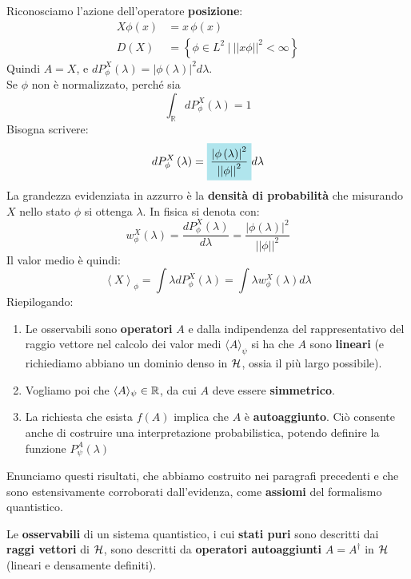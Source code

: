 \documentclass[../../FisicaTeorica.tex]{subfiles}
\begin{document}
Riconosciamo l'azione dell'operatore \textbf{posizione}:
\begin{align*}
    X\phi \left(x\right)&=x\,\phi \left(x\right)\\
    D\left(X\right)&=\left\{\phi\in L^2\ |\ \left|\left|x\phi\right|\right|^2<\infty\right\}
\end{align*}
Quindi $A=X$, e $dP_\phi^X(\lambda) = |\phi(\lambda)|^2 d\lambda$.\\
Se $\phi$  non è normalizzato, perché sia \[ \int_{\mathbb{R}}{dP_\phi^X\left(\lambda\right)}=1 \]
Bisogna scrivere:
\[
dP_\phi^X\left(\lambda\right)=\hlc{SkyBlue}{\frac{\left|\phi\left(\lambda\right)\right|^2}{\left|\left|\phi\right|\right|^2}}d\lambda 
\]
La grandezza evidenziata in azzurro è la \textbf{densità di probabilità} che misurando $X$ nello stato $\phi$ si ottenga $\lambda$. In fisica si denota con:
\[
w_\phi^X\left(\lambda\right)=\frac{dP_\phi^X\left(\lambda\right)}{d\lambda}=\frac{\left|\phi\left(\lambda\right)\right|^2}{\left|\left|\phi\right|\right|^2}
\]
Il valor medio è quindi:
\[
\left\langle X\right\rangle_\phi=\int \lambda  dP_\phi^X\left(\lambda\right)=\int \lambda  w_\phi^X\left(\lambda\right) d\lambda 
\]
Riepilogando: 
\begin{enumerate}
    \item Le osservabili sono \textbf{operatori} $A$ e dalla indipendenza del rappresentativo del raggio vettore nel calcolo dei valor medi $\langle A\rangle_\psi$ si ha che $A$ sono \textbf{lineari} (e richiediamo abbiano un dominio denso in $\mathcal{H}$, ossia il più largo possibile).
    \item Vogliamo poi che $\langle A \rangle_\psi \in \mathbb{R}$, da cui $A$ deve essere \textbf{simmetrico}.
    \item La richiesta che esista $f\left(A\right)$ implica che $A$ è \textbf{autoaggiunto}.  Ciò consente anche di costruire una interpretazione probabilistica, potendo definire la funzione $P_\psi^A\left(\lambda\right)$
\end{enumerate}
Enunciamo questi risultati, che abbiamo costruito nei paragrafi precedenti e che sono estensivamente corroborati dall'evidenza, come \textbf{assiomi} del formalismo quantistico.
\begin{axi}
Le \textbf{osservabili} di un sistema quantistico, i cui \textbf{stati puri} sono descritti dai \textbf{raggi vettori} di $\mathcal{H}$, sono descritti da \textbf{operatori autoaggiunti} $A=A^\dag$ in $\mathcal{H}$ (lineari e densamente definiti).
\end{axi}
\end{document}
